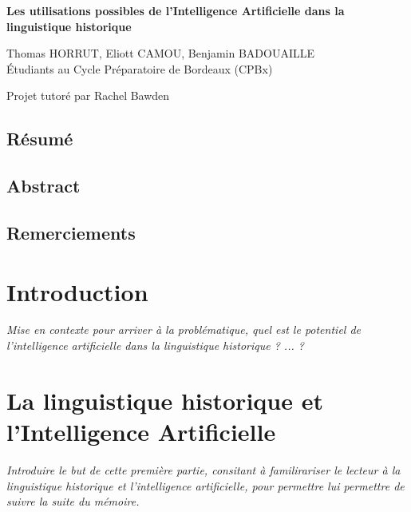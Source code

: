 \documentclass[12pt, french, twoside]{report}
\begin{document}
\begin{titlepage}
    \centering
    \vspace*{\fill}

    \huge\bfseries
    Les utilisations possibles de l'Intelligence Artificielle dans la linguistique historique
    
    \vspace*{1.5cm}
    \large Thomas HORRUT,\; Eliott CAMOU,\; Benjamin BADOUAILLE\\
    Étudiants au Cycle Préparatoire de Bordeaux (CPBx) 

    \vspace*{1.5cm}
    \large Projet tutoré par Rachel Bawden 
    
    \vspace*{\fill}
\end{titlepage}

\null
\setcounter{page}{1}
\thispagestyle{empty}
\newpage %
\section{Résumé}
\section{Abstract}
\section{Remerciements}


\tableofcontents
\listoffigures
\listoftables %

\printglossary %

\chapter{Introduction}
\textit{Mise en contexte pour arriver à la problématique, quel est le potentiel de l'intelligence artificielle dans la linguistique historique ? ... ?}

\chapter{La linguistique historique et l'Intelligence Artificielle}

\textit{Introduire le but de cette première partie, consitant à familirariser le lecteur à la linguistique historique et l'intelligence artificielle, pour permettre lui permettre de suivre la suite du mémoire.}
\end{document}
